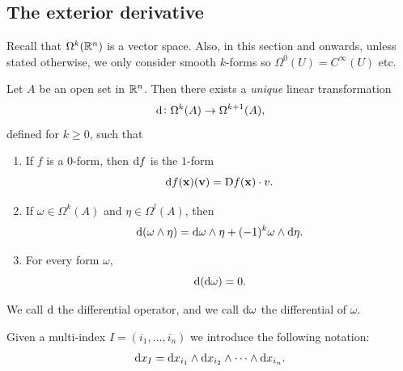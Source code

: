 \documentclass[11pt,a4paper]{article}
\begin{document}
\subsection{The exterior derivative}
\begin{remark}
  Recall that $\Omega^k(\mathbb{R}^n)$ is a vector space.
  Also, in this section and onwards,
  unless stated otherwise,
  we only consider smooth $k$-forms
  so $\Omega^0(U) = C^{\infty}(U)$ etc.
\end{remark}
\begin{theorem}
  \label{thm:uniqueness-of-exterior-derivative}
  Let $A$ be an open set in $\mathbb{R}^n$.
  Then there exists a \textit{unique} linear transformation
  \[
    \mathrm{d} \colon \Omega^k(A) \to \Omega^{k+1}(A),
  \]
  defined for $k \geq 0$, such that
  \begin{enumerate}
    \item[(1)] If $f$ is a $0$-form, then $\mathrm{d} f$ is the $1$-form
    \[
      \mathrm{d} f(\boldsymbol{\mathbf{x}})(\boldsymbol{\mathbf{v}}) = \mathrm{D} f(\boldsymbol{\mathbf{x}}) \cdot v.
    \]
    \item[(2)] If $\omega \in \Omega^k(A)$ and $\eta \in \Omega^l(A)$,
      then
      \[
        \mathrm{d} (\omega \wedge \eta) =
        \mathrm{d} \omega \wedge \eta + (-1)^{k} \omega \wedge \mathrm{d} \eta.
      \]
    \item[(3)] For every form $\omega$,
      \[
        \mathrm{d}(\mathrm{d} \omega) = 0.
      \]
  \end{enumerate}
\end{theorem}
\begin{remark}
  We call $\mathrm{d}$ the differential operator,
  and we call $\mathrm{d} \omega$ the differential of $\omega$.
\end{remark}

\begin{remark}
  Given a multi-index $I = (i_1,\dots,i_n)$ we introduce the following
  notation:
  \[
    \dx_{I} = \dx_{i_1} \wedge \dx_{i_2} \wedge \cdots \wedge \dx_{i_n}.
  \]
\end{remark}
\end{document}
